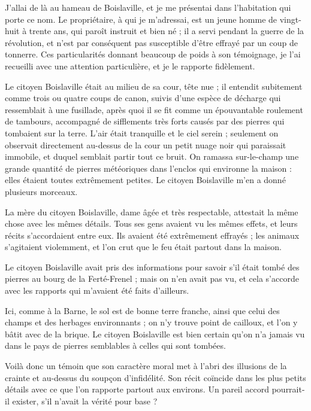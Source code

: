 \documentclass[a4paper, 11pt, oneside, polutonikogreek, french]{article}
\begin{document}
J'allai de là au hameau de Boislaville, et je me présentai dans l'habitation qui porte ce nom. Le propriétaire, à qui je m'adressai, est un jeune homme de vingt-huit à trente ans, qui paroît instruit et bien né ; il a servi pendant la guerre de la révolution, et n'est par conséquent pas susceptible d'être effrayé par un coup de tonnerre. Ces particularités donnant beaucoup de poids à son témoignage, je l'ai recueilli avec une attention particulière, et je le rapporte fidèlement.

Le citoyen Boislaville était au milieu de sa cour, tête nue ; il entendit subitement comme trois ou quatre coups de canon, suivis d'une espèce de décharge qui ressemblait à une fusillade, après quoi il se fit comme un épouvantable roulement de tambours, accompagné de sifflements très forts causés par des pierres qui tombaient sur la terre. L'air était tranquille et le ciel serein ; seulement on observait directement au-dessus de la cour un petit nuage noir qui paraissait immobile, et duquel semblait partir tout ce bruit. On ramassa sur-le-champ une grande quantité de pierres météoriques dans l'enclos qui environne la maison : elles étaient toutes extrêmement petites. Le citoyen Boislaville m'en a donné plusieurs morceaux.

La mère du citoyen Boislaville, dame âgée et très respectable, attestait la même chose avec les mêmes détails. Tous ses gens avaient vu les mêmes effets, et leurs récits s'accordaient entre eux. Ils avaient été extrêmement effrayés ; les animaux s'agitaient violemment, et l'on crut que le feu était partout dans la maison.

Le citoyen Boislaville avait pris des informations pour savoir s'il était tombé des pierres au bourg de la Ferté-Frenel ; mais on n'en avait pas vu, et cela s'accorde avec les rapports qui m'avaient été faits d'ailleurs.

Ici, comme à la Barne, le sol est de bonne terre franche, ainsi que celui des champs et des herbages environnants ; on n'y trouve point de cailloux, et l'on y bâtit avec de la brique. Le citoyen Boislaville est bien certain qu'on n'a jamais vu dans le pays de pierres semblables à celles qui sont tombées.

Voilà donc un témoin que son caractère moral met à l'abri des illusions de la crainte et au-dessus du soupçon d'infidélité. Son récit coïncide dans les plus petits détails avec ce que l'on rapporte partout aux environs. Un pareil accord pourrait-il exister, s'il n'avait la vérité pour base ?
\end{document}

